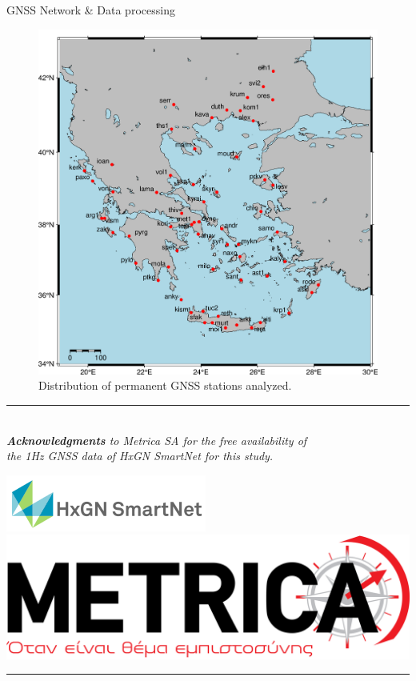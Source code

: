\documentclass[final,a0,portrait]{beamer}
\newlength{\onecolwid}
\begin{document}
\begin{frame}[t]
\begin{columns}[t]
\begin{column}{\onecolwid}
\begin{block}{GNSS Network \& Data processing}
\begin{figure}
\begin{center}
  \includegraphics[width=.75\textwidth]{figures/gnss_network.png}
\end{center}
    \caption{Distribution of permanent GNSS stations analyzed.}
    \label{fig:proc-net}
\end{figure} 
\begin{center}
\vspace*{-1.7cm}
\textcolor{blue!40}{\rule{\textwidth}{1pt}}\\
{\footnotesize \textit{\textbf{Acknowledgments} to Metrica SA for the free availability of\\ the 1Hz GNSS data of HxGN SmartNet for this study.}}

\hspace*{1cm}
  \includegraphics[width=.3\textwidth]{logo_HXgn.png}
  \includegraphics[width=.2\textwidth]{logo_metrica.png}
\end{center}   
\vspace*{-1.2cm}
\textcolor{blue!40}{\rule{\textwidth}{1pt}}\\
    
\end{block}


\end{column}
\end{columns}
\end{frame}
\end{document}
